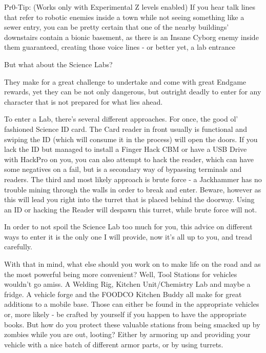 Pr0-Tip: (Works only with Experimental Z levels enabled) If you hear talk lines that refer to robotic enemies inside a town while not seeing something like a sewer entry, you can be pretty certain that one of the nearby buildings' downstairs contain a bionic basement, as there is an Insane Cyborg enemy inside them guaranteed, creating those voice lines - or better yet, a lab entrance

But what about the Science Labs?

They make for a great challenge to undertake and come with great Endgame rewards, yet they can be not only dangerous, but outright deadly to enter for any character that is not prepared for what lies ahead.

To enter a Lab, there's several different approaches. For once, the good ol' fashioned Science ID card. The Card reader in front usually is functional and swiping the ID (which will consume it in the process) will open the doors. If you lack the ID but managed to install a Finger Hack CBM or have a USB Drive with HackPro on you, you can also attempt to hack the reader, which can have some negatives on a fail, but is a secondary way of bypassing terminals and readers. The third and most likely approach is brute force - a Jackhammer has no trouble mining through the walls in order to break and enter. Beware, however as this will lead you right into the turret that is placed behind the doorway. Using an ID or hacking the Reader will despawn this turret, while brute force will not.

In order to not spoil the Science Lab too much for you, this advice on different ways to enter it is the only one I will provide, now it's all up to you, and tread carefully.

With that in mind, what else should you work on to make life on the road and as the most powerful being more convenient? Well, Tool Stations for vehicles wouldn't go amiss. A Welding Rig, Kitchen Unit/Chemistry Lab and maybe a fridge. A vehicle forge and the FOODCO Kitchen Buddy all make for great additions to a mobile base. Those can either be found in the appropriate vehicles or, more likely - be crafted by yourself if you happen to have the appropriate books. But how do you protect these valuable stations from being smacked up by zombies while you are out, looting? Either by armoring up and providing your vehicle with a nice batch of different armor parts, or by using turrets.

